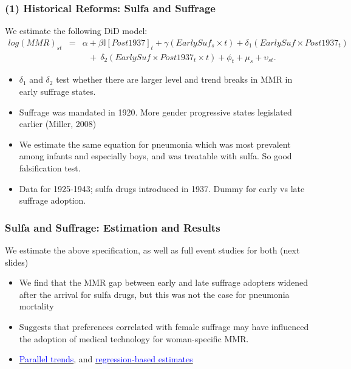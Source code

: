 \documentclass[10pt,letterpaper,subeqn]{beamer}
\begin{document}
\begin{frame}
\frametitle{(1) Historical Reforms: Sulfa and Suffrage}

We estimate the following DiD model:
\scriptsize
\begin{eqnarray}
log(MMR)_{st} & = &\alpha + \beta \mathbb{I}[Post1937]_t + \gamma(EarlySuf_{s}\times t)
                + \delta_1 (EarlySuf\times Post1937_t) \nonumber \\
              & &\ \ \ + \ \delta_2 (EarlySuf\times Post1937_t\times t) + \phi_t + \mu_s
                + \upsilon_{st}. \nonumber
\end{eqnarray}
\normalsize
\begin{itemize}
  \item $\delta_1$ and $\delta_2$ test whether there are larger level and trend 
        breaks in MMR in early suffrage states.
  \item Suffrage was mandated in 1920.  More gender progressive states legislated
        earlier (Miller, 2008)
  \item We estimate the same equation for pneumonia which was most prevalent 
        among infants and especially boys, and was treatable with sulfa. So good 
        falsification test.
  \item Data for 1925-1943; sulfa drugs introduced in 1937. Dummy for early vs 
        late suffrage adoption.
\end{itemize}
\end{frame}

\begin{frame}[label=USA]
\frametitle{Sulfa and Suffrage: Estimation and Results}
We estimate the above specification, as well as full event studies for both 
(next slides)
\vspace{5mm}
\begin{itemize}
  \item We find that the MMR gap between early and late suffrage adopters widened 
        after the arrival for sulfa drugs, but this was not the case for 
        pneumonia mortality
  \item Suggests that preferences correlated with female suffrage may have 
        influenced the adoption of medical technology for woman-specific MMR.
  \item \hyperlink{ptrends}{\textcolor{blue}{Parallel trends}}, and 
        \hyperlink{DDreg}{\textcolor{blue}{regression-based estimates}}
\end{itemize}

\end{frame}
\end{document}
